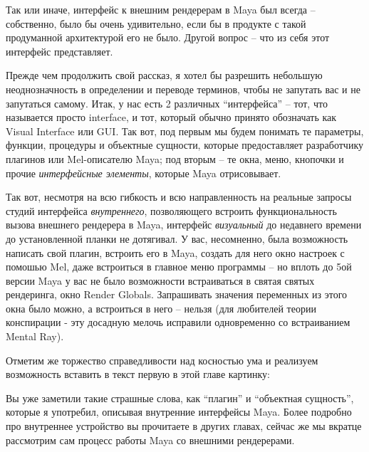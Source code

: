 Так или иначе, интерфейс к внешним рендерерам в
   Maya был всегда – собственно, было бы очень удивительно, если бы в
   продукте с такой продуманной архитектурой  его не было. Другой вопрос – что
   из себя этот интерфейс представляет.
 

Прежде чем продолжить свой рассказ, я хотел бы
   разрешить небольшую неоднозначность в определении и переводе
   терминов, чтобы не запутать вас и не запутаться самому. Итак, у нас
   есть 2 различных “интерфейса” – тот, что называется просто interface, и тот, который обычно принято обозначать как Visual Interface или GUI. Так вот, под
   первым мы будем понимать те параметры, функции, процедуры и
   объектные сущности, которые предоставляет разработчику плагинов
   или Mel-описателю Maya; под вторым –
   те окна, меню, кнопочки и прочие {\it интерфейсные элементы},
   которые Maya отрисовывает.
 

Так вот, несмотря на всю гибкость и всю
   направленность на реальные запросы студий интерфейса {\it внутреннего}, позволяющего встроить
   функциональность вызова внешнего рендерера в Maya, интерфейс {\it визуальный} до недавнего
   времени до установленной планки не дотягивал. У вас, несомненно,
   была возможность написать свой плагин, встроить его в Maya,
   создать для него окно настроек с помошью Mel, даже
   встроиться в главное меню программы – но вплоть до 5ой
   версии Maya у вас не было возможности встраиваться в святая
   святых рендеринга, окно Render Globals.
   Запрашивать значения переменных из этого окна было можно, а
   встроиться в него – нельзя (для любителей теории
   конспирации  - эту
   досадную мелочь исправили одновременно со встраиванием Mental Ray).
 

Отметим же торжество справедливости над косностью
   ума и реализуем возможность вставить в текст первую в этой главе
   картинку:
 

Вы уже заметили такие страшные слова, как “плагин”
   и “объектная сущность”, которые я употребил, описывая внутренние
   интерфейсы Maya. Более
   подробно про внутреннее устройство вы прочитаете в других главах,
   сейчас же мы вкратце рассмотрим сам процесс  работы Maya со внешними
   рендерерами.
